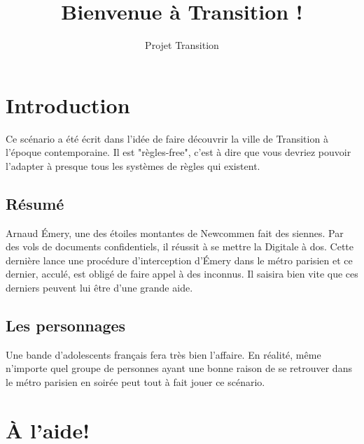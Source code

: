 \documentclass[10pt,a4paper,twocolumn]{article}
\author{Projet Transition}
\title{Bienvenue à Transition !}
\begin{document}
\maketitle
\section{Introduction}
Ce scénario a été écrit dans l'idée de faire découvrir la ville de Transition à l'époque contemporaine. Il est "règles-free", c'est à dire que vous devriez pouvoir l'adapter à presque tous les systèmes de règles qui existent.
\subsection{Résumé}
Arnaud Émery, une des étoiles montantes de Newcommen fait des siennes. Par des vols de documents confidentiels, il réussit à se mettre la Digitale à dos. Cette dernière lance une procédure d'interception d'Émery dans le métro parisien et ce dernier, acculé, est obligé de faire appel à des inconnus. Il saisira bien vite que ces derniers peuvent lui être d'une grande aide.
\subsection{Les personnages}
Une bande d'adolescents français fera très bien l'affaire. En réalité, même n'importe quel groupe de personnes ayant une bonne raison de se retrouver dans le métro parisien en soirée peut tout à fait jouer ce scénario.


\section{À l'aide!}
\end{document}
